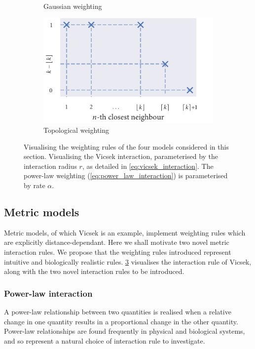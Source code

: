 \begin{figure}[tb]
\begin{subfigure}[b]{0.5\textwidth}
        \caption{Gaussian weighting}
        \label{fig:gauss_weight}
    \end{subfigure}%
    \begin{subfigure}[b]{0.5\textwidth}
        \includegraphics{topological_weighting.pdf}
        \caption{Topological weighting}
        \label{fig:top_weight}
    \end{subfigure}
    \caption{Visualising the weighting rules of the four models considered in this
    section.  Visualising the Vicsek interaction, parameterised by
    the interaction radius $r$, as detailed in \cref{eq:vicsek_interaction}.
     The power-law weighting (\cref{eq:power_law_interaction}) is
    parameterised by rate $\alpha$.
    }
    \label{fig:weighting_rules}
\end{figure}

\subsection{Metric models}

Metric models, of which Vicsek is an example, implement weighting rules which are
explicitly distance-dependant. Here we shall motivate two novel metric interaction rules.
We propose that the weighting rules introduced represent intuitive and biologically
realistic rules. \cref{fig:weighting_rules} visualises the interaction rule of Vicsek,
along with the two novel interaction rules to be introduced.


\subsubsection{Power-law interaction}

A power-law relationship between two quantities is realised when a relative change in
one quantity results in a proportional change in the other quantity. Power-law
relationships are found frequently in physical and biological systems, and so represent a
natural choice of interaction rule to investigate.

